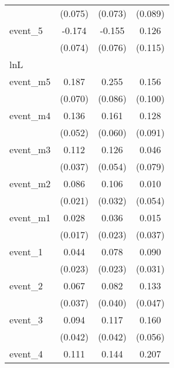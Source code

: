 {\begin{tabular}{l*{3}{c}}
            &     (0.075)         &     (0.073)         &     (0.089)         \\
[1em]
event\_5     &      -0.174\sym{*}  &      -0.155\sym{*}  &       0.126         \\
            &     (0.074)         &     (0.076)         &     (0.115)         \\
\hline
lnL         &                     &                     &                     \\
event\_m5    &       0.187\sym{**} &       0.255\sym{**} &       0.156         \\
            &     (0.070)         &     (0.086)         &     (0.100)         \\
[1em]
event\_m4    &       0.136\sym{**} &       0.161\sym{**} &       0.128         \\
            &     (0.052)         &     (0.060)         &     (0.091)         \\
[1em]
event\_m3    &       0.112\sym{**} &       0.126\sym{*}  &       0.046         \\
            &     (0.037)         &     (0.054)         &     (0.079)         \\
[1em]
event\_m2    &       0.086\sym{***}&       0.106\sym{***}&       0.010         \\
            &     (0.021)         &     (0.032)         &     (0.054)         \\
[1em]
event\_m1    &       0.028         &       0.036         &       0.015         \\
            &     (0.017)         &     (0.023)         &     (0.037)         \\
[1em]
event\_1     &       0.044         &       0.078\sym{***}&       0.090\sym{**} \\
            &     (0.023)         &     (0.023)         &     (0.031)         \\
[1em]
event\_2     &       0.067         &       0.082\sym{*}  &       0.133\sym{**} \\
            &     (0.037)         &     (0.040)         &     (0.047)         \\
[1em]
event\_3     &       0.094\sym{*}  &       0.117\sym{**} &       0.160\sym{**} \\
            &     (0.042)         &     (0.042)         &     (0.056)         \\
[1em]
event\_4     &       0.111         &       0.144\sym{**} &       0.207\sym{**} \\

\end{tabular}}
